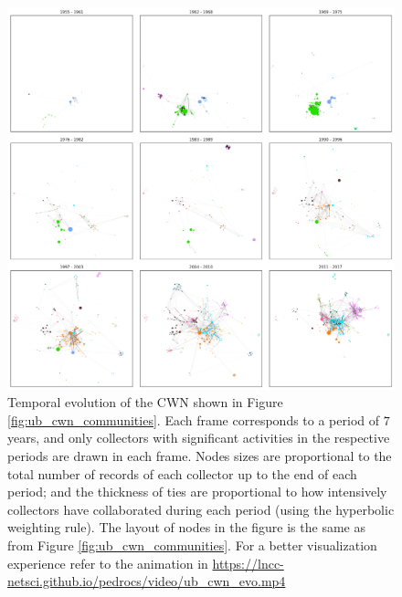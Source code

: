 \begin{figure}[h!]
  	\centering
    \includegraphics[width=\linewidth]{figures/casestudy_ub/cwn_temporal_evol.png}
    \caption[Temporal evolution of the UB CWN.]{ Temporal evolution of the CWN shown in Figure \ref{fig:ub_cwn_communities}. Each frame corresponds to a period of $7$ years, and only collectors with significant activities in the respective periods are drawn in each frame. Nodes sizes are proportional to the total number of records of each collector up to the end of each period; and the thickness of ties are proportional to how intensively collectors have collaborated during each period (using the hyperbolic weighting rule). The layout of nodes in the figure is the same as from Figure \ref{fig:ub_cwn_communities}. For a better visualization experience refer to the animation in \url{https://lncc-netsci.github.io/pedrocs/video/ub_cwn_evo.mp4}}
    \label{fig:ub_cwn_temporal_evol}
\end{figure}


